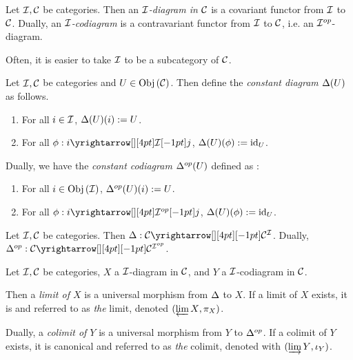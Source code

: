 \begin{dfn}[(Co)Diagrams]
  
  Let $\mathcal{I}, \mathcal{C}$ be categories. 
  Then an \emph{$\mathcal{I}$-diagram in $\mathcal{C}$} is 
  a covariant functor from $\mathcal{I}$ to $\mathcal{C}$. 
  Dually, an \emph{$\mathcal{I}$-codiagram} is a contravariant functor 
  from $\mathcal{I}$ to $\mathcal{C}$,
  i.e. an $\mathcal{I}^{op}$-diagram. 
\end{dfn}

\begin{rmk}
  Often, it is easier to take $\mathcal{I}$ to be a subcategory of $\mathcal{C}$. 
\end{rmk}

\begin{dfn}
  
  Let $\mathcal{I}, \mathcal{C}$ be categories and $U \in \mathrm{Obj}\left(\mathcal{C}\right)$. 
  Then define the \emph{constant diagram $\Delta(U)$} as follows. 
  \begin{enumerate}
    \item For all $i \in \mathcal{I}$, $\Delta(U)(i) := U$. 
    \item For all $\phi : \map{i}{j}{\II}{}$, 
    $\Delta(U)(\phi) := \mathrm{id}_{U}$.
  \end{enumerate}
  Dually, we have the \emph{constant codiagram $\Delta^{op}(U)$} defined as : 
  \begin{enumerate}
    \item For all $i \in \mathrm{Obj}\left(\mathcal{I}\right)$, $\Delta^{op}(U)(i) := U$. 
    \item For all $\phi : \map{i}{j}{\II\op}{}$, 
    $\Delta(U)(\phi) := \mathrm{id}_{U}$.
  \end{enumerate}
\end{dfn}

\begin{prop}
  
  Let $\mathcal{I}, \mathcal{C}$ be categories. 
  Then $\De : \map{\CC}{\CC^\II}{}{}$.
  Dually, $\De\op : \map{\CC}{\CC^{\II\op}}{}{}$.
\end{prop}

\begin{dfn}
  
  Let $\mathcal{I}, \mathcal{C}$ be categories, $X$ a $\mathcal{I}$-diagram in $\mathcal{C}$,
  and $Y$ a $\mathcal{I}$-codiagram in $\mathcal{C}$.

  Then a \emph{limit of $X$} is a universal morphism 
  from $\Delta$ to $X$. 
  If a limit of $X$ exists, 
  it is  and 
  referred to as \emph{the} limit,
  denoted $(\varprojlim{X}{}, \pi_X)$.
  
  Dually, a \emph{colimit of $Y$} is a universal morphism from $Y$ to $\Delta^{op}$. 
  If a colimit of $Y$ exists, 
  it is canonical and referred to as \emph{the} colimit, 
  denoted with $(\varinjlim{Y}{}, \iota_Y)$.
\end{dfn}


